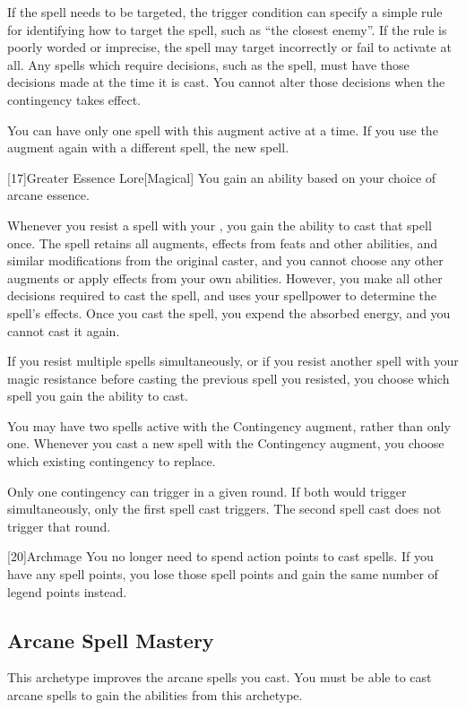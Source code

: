         If the spell needs to be targeted, the trigger condition can specify a simple rule for identifying how to target the spell, such as ``the closest enemy''.
        If the rule is poorly worded or imprecise, the spell may target incorrectly or fail to activate at all.
        Any spells which require decisions, such as the  spell, must have those decisions made at the time it is cast.
        You cannot alter those decisions when the contingency takes effect.

        You can have only one spell with this augment active at a time.
        If you use the augment again with a different spell, the new spell.

        [17]{Greater Essence Lore}[Magical]
        You gain an ability based on your choice of arcane essence.

         Whenever you resist a spell with your , you gain the ability to cast that spell once.
        The spell retains all augments, effects from feats and other abilities, and similar modifications from the original caster, and you cannot choose any other augments or apply effects from your own abilities.
        However, you make all other decisions required to cast the spell, and uses your spellpower to determine the spell's effects.
        Once you cast the spell, you expend the absorbed energy, and you cannot cast it again.

        If you resist multiple spells simultaneously, or if you resist another spell with your magic resistance before casting the previous spell you resisted, you choose which spell you gain the ability to cast.

         You may have two spells active with the Contingency augment, rather than only one.
        Whenever you cast a new spell with the Contingency augment, you choose which existing contingency to replace.

        Only one contingency can trigger in a given round.
        If both would trigger simultaneously, only the first spell cast triggers.
        The second spell cast does not trigger that round.

        [20]{Archmage}
        You no longer need to spend action points to cast spells.
        If you have any spell points, you lose those spell points and gain the same number of legend points instead.

    \subsection{Arcane Spell Mastery}
        This archetype improves the arcane spells you cast.
        You must be able to cast arcane spells to gain the abilities from this archetype.

